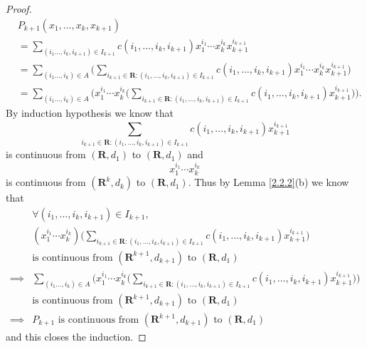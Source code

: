 \begin{proof}
\begin{align*}
         & P_{k + 1}(x_1, \dots, x_k, x_{k + 1})                                                                                                                                                                                \\
         & = \sum_{(i_1 \dots, i_k, i_{k + 1}) \in I_{k + 1}} c(i_1, \dots, i_k, i_{k + 1}) x_1^{i_1} \cdots x_k^{i_k} x_{k + 1}^{i_{k + 1}}                                                                                    \\
         & = \sum_{(i_1 \dots, i_k) \in A} \bigg(\sum_{i_{k + 1} \in \mathbf{R} : (i_1, \dots, i_k, i_{k + 1}) \in I_{k + 1}} c(i_1, \dots, i_k, i_{k + 1}) x_1^{i_1} \cdots x_k^{i_k} x_{k + 1}^{i_{k + 1}}\bigg)              \\
         & = \sum_{(i_1 \dots, i_k) \in A} \Bigg(x_1^{i_1} \cdots x_k^{i_k} \bigg(\sum_{i_{k + 1} \in \mathbf{R} : (i_1, \dots, i_k, i_{k + 1}) \in I_{k + 1}} c(i_1, \dots, i_k, i_{k + 1}) x_{k + 1}^{i_{k + 1}}\bigg)\Bigg).
    \end{align*}
    By induction hypothesis we know that
    \[
        \sum_{i_{k + 1} \in \mathbf{R} : (i_1, \dots, i_k, i_{k + 1}) \in I_{k + 1}} c(i_1, \dots, i_k, i_{k + 1}) x_{k + 1}^{i_{k + 1}}
    \]
    is continuous from \((\mathbf{R}, d_1)\) to \((\mathbf{R}, d_1)\) and
    \[
        x_1^{i_1} \cdots x_k^{i_k}
    \]
    is continuous from \((\mathbf{R}^k, d_k)\) to \((\mathbf{R}, d_1)\).
    Thus by Lemma \ref{2.2.2}(b) we know that
    \begin{align*}
                 & \forall (i_1, \dots, i_k, i_{k + 1}) \in I_{k + 1},                                                                                                                                                               \\
                 & (x_1^{i_1} \cdots x_k^{i_k}) \bigg(\sum_{i_{k + 1} \in \mathbf{R} : (i_1, \dots, i_k, i_{k + 1}) \in I_{k + 1}} c(i_1, \dots, i_k, i_{k + 1}) x_{k + 1}^{i_{k + 1}}\bigg)                                         \\
                 & \text{is continuous from } (\mathbf{R}^{k + 1}, d_{k + 1}) \text{ to } (\mathbf{R}, d_1)                                                                                                                          \\
        \implies & \sum_{(i_1 \dots, i_k) \in A} \Bigg(x_1^{i_1} \cdots x_k^{i_k} \bigg(\sum_{i_{k + 1} \in \mathbf{R} : (i_1, \dots, i_k, i_{k + 1}) \in I_{k + 1}} c(i_1, \dots, i_k, i_{k + 1}) x_{k + 1}^{i_{k + 1}}\bigg)\Bigg) \\
                 & \text{is continuous from } (\mathbf{R}^{k + 1}, d_{k + 1}) \text{ to } (\mathbf{R}, d_1)                                                                                                                          \\
        \implies & P_{k + 1} \text{ is continuous from } (\mathbf{R}^{k + 1}, d_{k + 1}) \text{ to } (\mathbf{R}, d_1)
    \end{align*}
    and this closes the induction.
\end{proof}

